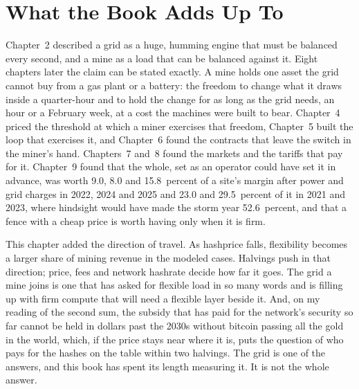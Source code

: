 \section{What the Book Adds Up To}
\label{sec:outlook-close}

Chapter~2 described a grid as a huge, humming engine that must be balanced every second, and a mine as a load that can be balanced against it. Eight chapters later the claim can be stated exactly. A mine holds one asset the grid cannot buy from a gas plant or a battery: the freedom to change what it draws inside a quarter-hour and to hold the change for as long as the grid needs, an hour or a February week, at a cost the machines were built to bear. Chapter~4 priced the threshold at which a miner exercises that freedom, Chapter~5 built the loop that exercises it, and Chapter~6 found the contracts that leave the switch in the miner's hand. Chapters~7 and~8 found the markets and the tariffs that pay for it. Chapter~9 found that the whole, set as an operator could have set it in advance, was worth 9.0, 8.0 and 15.8~percent of a site's margin after power and grid charges in 2022, 2024 and 2025 and 23.0 and 29.5~percent of it in 2021 and 2023, where hindsight would have made the storm year 52.6~percent, and that a fence with a cheap price is worth having only when it is firm. %

This chapter added the direction of travel. As hashprice falls, flexibility becomes a larger share of mining revenue in the modeled cases. Halvings push in that direction; price, fees and network hashrate decide how far it goes. The grid a mine joins is one that has asked for flexible load in so many words and is filling up with firm compute that will need a flexible layer beside it. And, on my reading of the second sum, the subsidy that has paid for the network's security so far cannot be held in dollars past the 2030s without bitcoin passing all the gold in the world, which, if the price stays near where it is, puts the question of who pays for the hashes on the table within two halvings. The grid is one of the answers, and this book has spent its length measuring it. It is not the whole answer.

